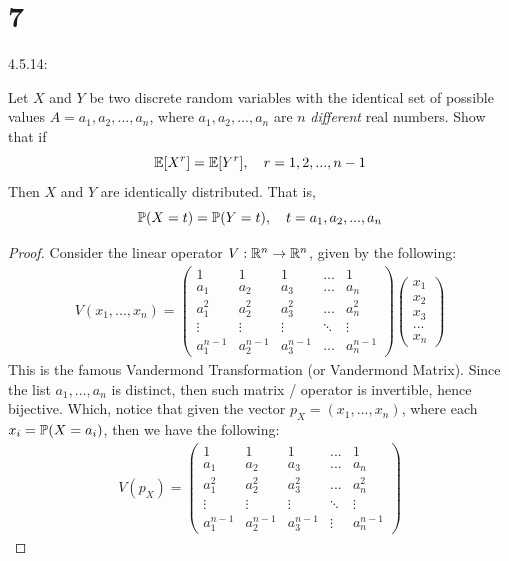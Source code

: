 \documentclass{article}
\begin{document}
\section*{7}
\begin{ques}\label{q7}
    4.5.14:

    Let $X$ and $Y$ be two discrete random variables with the identical set of possible values $A={a_1,a_2,...,a_n}$, where $a_1,a_2,...,a_n$ are $n$ \emph{different} real numbers. Show that if 
    $$\mathbb{E}[X^r]=\mathbb{E}[Y^r], \quad r=1,2,...,n-1$$
    Then $X$ and $Y$ are identically distributed. That is,
    $$\mathbb{P}(X=t)=\mathbb{P}(Y=t),\quad t=a_1,a_2,...,a_n$$
\end{ques}
\begin{proof}
    Consider the linear operator $V:\mathbb{R}^n \rightarrow \mathbb{R}^n$, given by the following:
    \begin{align}
        V(x_1,...,x_n) = \begin{pmatrix}
            1 & 1 & 1 & ... & 1\\
            a_1 & a_2 & a_3& ... & a_n\\
            a_1^2 & a_2^2 & a_3^2 & ... & a_n^2\\
            \vdots & \vdots & \vdots & \ddots & \vdots\\
            a_1^{n-1} & a_2^{n-1} & a_3^{n-1} & ... & a_n^{n-1}
        \end{pmatrix}\begin{pmatrix}
            x_1\\x_2\\x_3\\...\\x_n
        \end{pmatrix}
    \end{align}
    This is the famous Vandermond Transformation (or Vandermond Matrix). Since the list $a_1,...,a_n$ is distinct, then such matrix / operator is invertible, hence bijective. Which, notice that given the vector $p_X = (x_1,...,x_n)$, where each $x_i= \mathbb{P}(X=a_i)$, then we have the following:
    \begin{align}
        V(p_X) = \begin{pmatrix}
            1 & 1 & 1 & ... & 1\\
            a_1 & a_2 & a_3& ... & a_n\\
            a_1^2 & a_2^2 & a_3^2 & ... & a_n^2\\
            \vdots & \vdots & \vdots & \ddots & \vdots\\
            a_1^{n-1} & a_2^{n-1} & a_3^{n-1} & \vdots & a_n^{n-1}

\end{pmatrix}
\end{align}
\end{proof}
\end{document}
